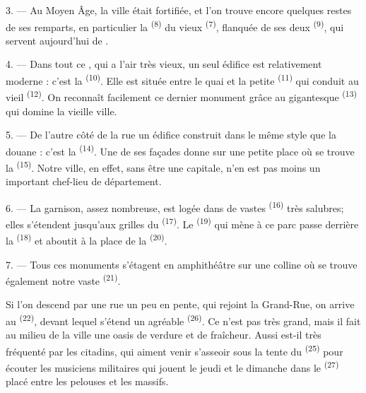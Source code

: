 3. --- Au Moyen Âge, la ville était fortifiée, et l'on trouve encore quelques
restes de ses remparts, en particulier la  \textsuperscript{(8)} du
vieux  \textsuperscript{(7)}, flanquée de ses deux
 \textsuperscript{(9)}, qui servent aujourd'hui de .

4. --- Dans tout ce , qui a l'air très vieux, un seul édifice
est relativement moderne : c'est la  \textsuperscript{(10)}. Elle
est située entre le quai et la petite  \textsuperscript{(11)} qui
conduit au vieil  \textsuperscript{(12)}. On reconnaît
facilement ce dernier monument grâce au gigantesque 
\textsuperscript{(13)} qui domine la vieille ville.

5. --- De l'autre côté de la rue  un édifice construit dans le
même style que la douane : c'est la  \textsuperscript{(14)}. Une
de ses façades donne sur une petite place où se trouve la 
\textsuperscript{(15)}. Notre ville, en effet, sans être une capitale, n'en est
pas moins un important chef-lieu de département.

\VUsaut{5.0mm}
\VUsaut{3.4mm}

6. --- La garnison, assez nombreuse, est logée dans de vastes 
\textsuperscript{(16)} très salubres; elles s'étendent jusqu'aux grilles du
 \textsuperscript{(17)}. Le 
\textsuperscript{(19)} qui mène à ce parc passe derrière la  \textsuperscript{(18)} et aboutit à la place de la
 \textsuperscript{(20)}.

7. --- Tous ces monuments s'étagent en amphithéâtre sur une colline où se trouve
également notre vaste  \textsuperscript{(21)}.

Si l'on descend par une rue un peu en pente, qui rejoint la Grand-Rue, on arrive
au  \textsuperscript{(22)}, devant lequel s'étend un
agréable  \textsuperscript{(26)}. Ce  n'est
pas très grand, mais il fait au milieu de la ville une oasis de verdure et de
fraîcheur. Aussi est-il très fréquenté par les citadins, qui aiment venir
s'asseoir sous la tente du  \textsuperscript{(25)} pour écouter les
musiciens militaires qui jouent le jeudi et le dimanche dans le
 \textsuperscript{(27)} placé entre les pelouses et les massifs.

